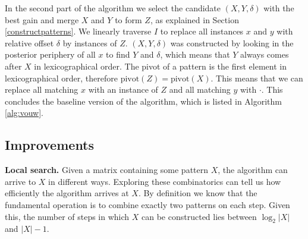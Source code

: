 \documentclass{llncs}
\begin{document}
In the second part of the algorithm we select the candidate $(X,Y,\delta)$ with the best gain and merge $X$ and $Y$ to form $Z$, as explained in Section \ref{constructpatterns}. We linearly traverse $I$ to replace all instances $x$ and $y$ with relative offset $\delta$  by instances of $Z$. $(X,Y,\delta)$ was constructed by looking in the posterior periphery of all $x$ to find $Y$ and $\delta$, which means that $Y$ always comes after $X$ in lexicographical order. The pivot of a pattern is the first element in lexicographical order, therefore $\mathrm{pivot}(Z) = \mathrm{pivot}(X)$. This means that we can replace all matching $x$ with an instance of $Z$ and all matching $y$ with $\cdot$. This concludes the baseline version of the algorithm, which is listed in Algorithm \ref{alg:vouw}. 

\subsection{Improvements}
\label{improvements}
\noindent \textbf{Local search.} Given a matrix containing some pattern $X$, the algorithm can arrive to $X$ in different ways. Exploring these combinatorics can tell us how efficiently the algorithm arrives at $X$. By definition we know that the fundamental operation is to combine exactly two patterns on each step. Given this, the number of steps in which $X$ can be constructed lies between $\log_2|X|$ and $|X|-1$. 


\end{document}
